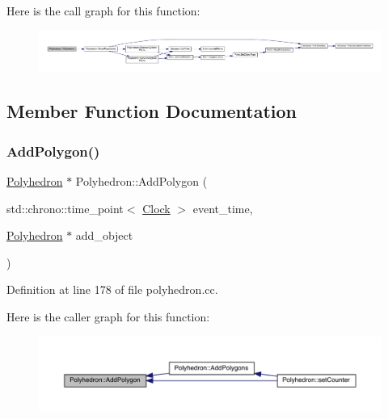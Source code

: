 Here is the call graph for this function\+:
\nopagebreak
\begin{figure}[H]
\begin{center}
\leavevmode
\includegraphics[width=350pt]{class_polyhedron_a3ad3df8be901a55ddcd97128ac890473_cgraph}
\end{center}
\end{figure}


\subsection{Member Function Documentation}
\mbox{\label{class_polyhedron_a63bc509a87935cc25e541d2490c01d1f}} 
\subsubsection{\texorpdfstring{Add\+Polygon()}{AddPolygon()}}
{\footnotesize\ttfamily \hyperlink{class_polyhedron}{Polyhedron} $\ast$ Polyhedron\+::\+Add\+Polygon (\begin{DoxyParamCaption}\item[{std\+::chrono\+::time\+\_\+point$<$ \hyperlink{universe_8h_a0ef8d951d1ca5ab3cfaf7ab4c7a6fd80}{Clock} $>$}]{event\+\_\+time,  }\item[{\hyperlink{class_polyhedron}{Polyhedron} $\ast$}]{add\+\_\+object }\end{DoxyParamCaption})}



Definition at line 178 of file polyhedron.\+cc.

Here is the caller graph for this function\+:
\nopagebreak
\begin{figure}[H]
\begin{center}
\leavevmode
\includegraphics[width=350pt]{class_polyhedron_a63bc509a87935cc25e541d2490c01d1f_icgraph}
\end{center}
\end{figure}
\mbox{\label{class_polyhedron_a9564a286e7323b56667971b851f0674a}} 
